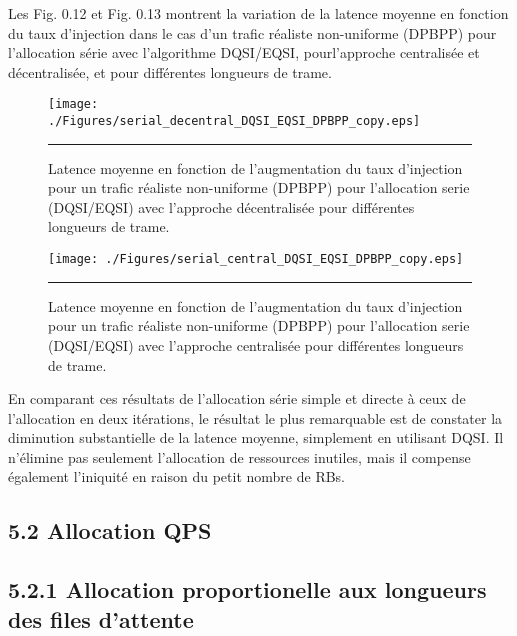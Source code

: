 Les Fig. 0.12 et Fig. 0.13 montrent la variation de la latence moyenne en fonction du taux d'injection dans le cas d’un trafic réaliste non-uniforme (DPBPP) pour l'allocation série avec l’algorithme DQSI/EQSI, pourl'approche centralisée et décentralisée, et pour différentes longueurs de trame. 



\begin{figure}[htbp]
  \centering
    \texttt{[image: ./Figures/serial\_decentral\_DQSI\_EQSI\_DPBPP\_copy.eps]}
    \rule{35em}{0.5pt}
  \caption[Latence moyenne en fonction de l'augmentation du taux d'injection pour un trafic réaliste non-uniforme (DPBPP) pour l'allocation serie(DQSI/EQSI) avec l'approche décentralisée pour différentes longueurs de trame.]{Latence moyenne en fonction de l'augmentation du taux d'injection pour un trafic réaliste non-uniforme (DPBPP) pour l'allocation serie (DQSI/EQSI) avec l'approche décentralisée pour différentes longueurs de trame.}
  \label{fig:Electron}
\end{figure}

\begin{figure}[htbp]
  \centering
    \texttt{[image: ./Figures/serial\_central\_DQSI\_EQSI\_DPBPP\_copy.eps]}
    \rule{35em}{0.5pt}
  \caption[Latence moyenne en fonction de l'augmentation du taux d'injection pour un trafic réaliste non-uniforme (DPBPP) pour l'allocation serie (DQSI/EQSI) avec l'approche centralisée pour différentes longueurs de trame.]{Latence moyenne en fonction de l'augmentation du taux d'injection pour un trafic réaliste non-uniforme (DPBPP) pour l'allocation serie (DQSI/EQSI) avec l'approche centralisée pour différentes longueurs de trame.}
  \label{fig:Electron}
\end{figure}

En comparant ces résultats de l'allocation série simple et directe à ceux de l’allocation en deux itérations, le résultat le plus remarquable est de constater la diminution substantielle de la latence moyenne, simplement en utilisant DQSI. Il n’élimine pas seulement l'allocation de ressources inutiles, mais il compense également l'iniquité en raison du petit nombre de RBs. 

\subsection*{5.2 Allocation QPS}

\subsection*{5.2.1 Allocation proportionelle aux longueurs des files d'attente  }

